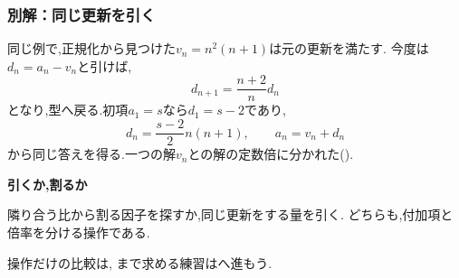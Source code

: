 \subsubsection{別解：同じ更新を引く}
同じ例で,正規化から見つけた$v_n=n^2(n+1)$は元の更新を満たす.
今度は$d_n=a_n-v_n$と引けば,
\[
  d_{n+1}=\frac{n+2}{n}d_n
\]
となり,型へ戻る.初項$a_1=s$なら$d_1=s-2$であり,
\[
  d_n=\frac{s-2}{2}n(n+1),\qquad a_n=v_n+d_n
\]
から同じ答えを得る.一つの解$v_n$との解の定数倍に分かれた().

\begin{bookpoint}
  \textbf{引くか,割るか}\par
  隣り合う比から割る因子を探すか,同じ更新をする量を引く.
  どちらも,付加項と倍率を分ける操作である.
\end{bookpoint}
操作だけの比較は,
まで求める練習はへ進もう.
